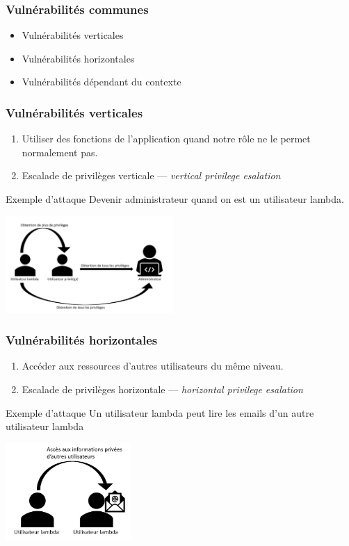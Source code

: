 \documentclass{beamer}
\begin{document}
\begin{frame}
  \frametitle{Vulnérabilités communes}
  \begin{itemize}
    \item Vulnérabilités verticales
    \item Vulnérabilités horizontales
    \item Vulnérabilités dépendant du contexte
  \end{itemize}
\end{frame}
\begin{frame}
  \frametitle{Vulnérabilités verticales}
  \begin{enumerate}
    \item[Vulnérabilité] Utiliser des fonctions de l'application quand notre rôle ne le permet normalement pas.
    \item[Type d'attaque] Escalade de privilèges verticale --- \emph{vertical privilege esalation}
  \end{enumerate}
  \begin{block}{Exemple d'attaque}
    Devenir administrateur quand on est un utilisateur lambda.
  \end{block}
  \begin{center}
    \includegraphics[height=10em]{escalade-vert}
  \end{center}
\end{frame}
\begin{frame}
  \frametitle{Vulnérabilités horizontales}
  \begin{enumerate}
    \item[Vulnérabilité] Accéder aux ressources d'autres utilisateurs du même niveau.
    \item[Type d'attaque] Escalade de privilèges horizontale --- \emph{horizontal privilege esalation}
  \end{enumerate}
  \begin{block}{Exemple d'attaque}
    Un utilisateur lambda peut lire les emails d'un autre utilisateur lambda
  \end{block}
  \begin{center}
    \includegraphics[height=10em]{escalade-hor}
  \end{center}
\end{frame}
\end{document}
